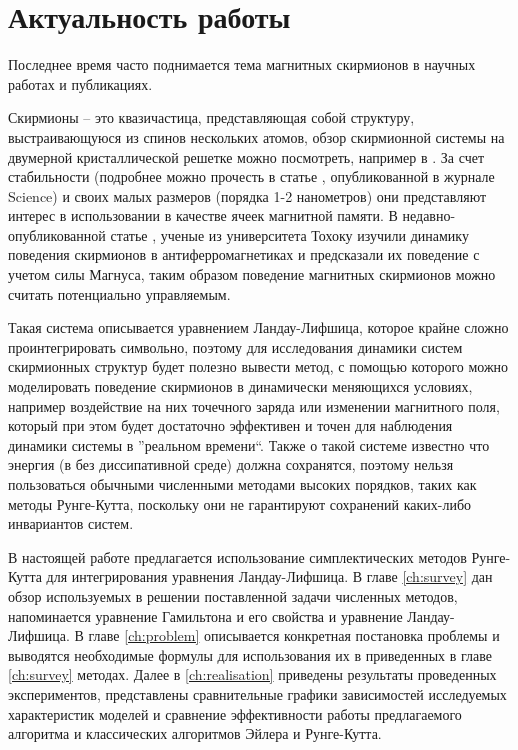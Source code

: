 \section{Актуальность работы}

Последнее время часто поднимается тема магнитных скирмионов в научных работах и
публикациях.

Скирмионы -- это квазичастица, представляющая собой структуру, выстраивающуюся
из спинов нескольких атомов, обзор скирмионной системы на двумерной
кристаллической решетке можно посмотреть, например в \cite{Yu2010}. За счет
стабильности (подробнее можно прочесть в статье \cite{nucleation},
опубликованной в журнале Science) и своих малых размеров (порядка 1-2
нанометров) они представляют интерес в использовании в качестве ячеек магнитной
памяти. В недавно-опубликованной статье \cite{stat-ant-dyn-prop-of-skyr},
ученые из университета Тохоку изучили динамику поведения скирмионов в
антиферромагнетиках и предсказали их поведение с учетом силы Магнуса, таким
образом поведение магнитных скирмионов можно считать потенциально управляемым.

Такая система описывается уравнением Ландау-Лифшица, которое крайне сложно
проинтегрировать символьно, поэтому для исследования динамики систем
скирмионных структур будет полезно вывести метод, с помощью которого можно
моделировать поведение скирмионов в динамически меняющихся условиях, например
воздействие на них точечного заряда или изменении магнитного поля, который при
этом будет достаточно эффективен и точен для наблюдения динамики системы в
''реальном времени``. Также о такой системе известно что энергия (в
без диссипативной среде) должна сохранятся, поэтому нельзя пользоваться
обычными численными методами высоких порядков, таких как методы Рунге-Кутта,
поскольку они не гарантируют сохранений каких-либо инвариантов систем.


В настоящей работе предлагается использование симплектических методов
Рунге-Кутта для интегрирования уравнения Ландау-Лифшица.
В главе \ref{ch:survey} дан обзор используемых в решении
поставленной задачи численных методов, напоминается уравнение Гамильтона и его
свойства и уравнение Ландау-Лифшица.
В главе \ref{ch:problem} описывается конкретная постановка проблемы и выводятся
необходимые формулы для использования их в приведенных в главе \ref{ch:survey}
методах.
Далее в \ref{ch:realisation} приведены результаты проведенных экспериментов,
представлены сравнительные графики зависимостей исследуемых характеристик
моделей и сравнение эффективности работы предлагаемого алгоритма и классических
алгоритмов Эйлера и Рунге-Кутта.

